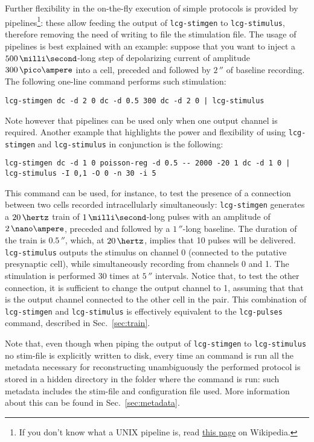 Further flexibility in the on-the-fly execution of simple protocols is
provided by pipelines\footnote{If you don't know what a UNIX pipeline
  is, read \href{http://en.wikipedia.org/wiki/Pipeline\_\%28Unix\%29}{this
    page} on Wikipedia.}: these allow feeding the output of
\verb+lcg-stimgen+ to \verb+lcg-stimulus+, therefore removing the need
of writing to file the stimulation file. The usage of pipelines is
best explained with an example: suppose that you want to inject a
$500\,\milli\second$-long step of depolarizing current of amplitude
$300\,\pico\ampere$ into a cell, preceded and followed by $2\,\second$
of baseline recording. The following one-line command performs such
stimulation:
\begin{lstlisting}
lcg-stimgen dc -d 2 0 dc -d 0.5 300 dc -d 2 0 | lcg-stimulus
\end{lstlisting}
Note however that pipelines can be used only when one output channel
is required. Another example that highlights the power and flexibility
of using \verb+lcg-stimgen+ and \verb+lcg-stimulus+ in conjunction is
the following:
\begin{lstlisting}
lcg-stimgen dc -d 1 0 poisson-reg -d 0.5 -- 2000 -20 1 dc -d 1 0 | lcg-stimulus -I 0,1 -O 0 -n 30 -i 5
\end{lstlisting}
This command can be used, for instance, to test the presence of a
connection between two cells recorded intracellularly simultaneously:
\verb+lcg-stimgen+ generates a $20\,\hertz$ train of
$1\,\milli\second$-long pulses with an amplitude of $2\,\nano\ampere$,
preceded and followed by a $1\,\second$-long baseline. The duration of
the train is $0.5\,\second$, which, at $20\,\hertz$, implies that 10
pulses will be delivered. \verb+lcg-stimulus+ outputs the stimulus on
channel 0 (connected to the putative presynaptic cell), while
simultaneously recording from channels 0 and 1. The stimulation is
performed 30 times at $5\,\second$ intervals. Notice that, to test the
other connection, it is sufficient to change the output channel to 1,
assuming that that is the output channel connected to the other cell
in the pair. This combination of \verb+lcg-stimgen+ and
\verb+lcg-stimulus+ is effectively equivalent to the \verb+lcg-pulses+
command, described in Sec.~\ref{sec:train}.

Note that, even though when piping the output of \verb+lcg-stimgen+ to
\verb+lcg-stimulus+ no stim-file is explicitly written to disk, every
time an \progname command is run all the metadata necessary for
reconstructing unambiguously the performed protocol is stored in a
hidden directory in the folder where the command is run: such metadata
includes the stim-file and configuration file used. More information
about this can be found in Sec.~\ref{sec:metadata}.

